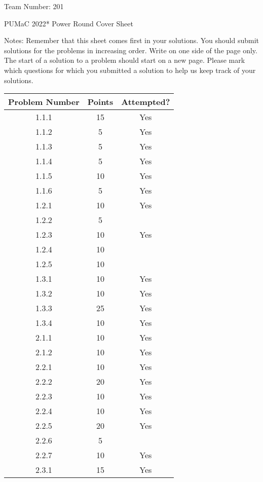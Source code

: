 \documentclass[12pt]{article}
\newcommand{\TeamNumber}{201}
\begin{document}
\thispagestyle{empty}
\noindent \huge{Team Number:} \TeamNumber
\vspace{.5cm}

\noindent \huge{PUMaC 2022* Power Round Cover Sheet}

\vspace{.5cm}
\normalsize
\begin{paragraph}{Notes:}
Remember that this sheet comes first in your solutions. You should submit solutions for the problems in increasing order. Write on one side of the page only. The start of a solution to a problem should start on a new page. Please mark which questions for which you submitted a solution to help us keep track of your solutions.
\end{paragraph}
\begin{center}
\begin{tabular}{|c|c|c|}\hline
Problem Number & Points & Attempted?\\\hline
1.1.1 & 15 & Yes \\\hline
1.1.2 & 5 & Yes \\\hline
1.1.3 & 5 & Yes \\\hline
1.1.4 & 5 & Yes \\\hline
1.1.5 & 10 & Yes \\\hline
1.1.6 & 5 & Yes \\\hline
1.2.1 & 10 & Yes \\\hline
1.2.2 & 5 &  \\\hline
1.2.3 & 10 & Yes \\\hline
1.2.4 & 10 & \\\hline
1.2.5 & 10 & \\\hline
1.3.1 & 10 & Yes \\\hline
1.3.2 & 10 & Yes \\\hline
1.3.3 & 25 & Yes \\\hline
1.3.4 & 10 & Yes \\\hline
2.1.1 & 10 & Yes \\\hline
2.1.2 & 10 & Yes \\\hline
2.2.1 & 10 & Yes \\\hline
2.2.2 & 20 & Yes \\\hline
2.2.3 & 10 & Yes \\\hline
2.2.4 & 10 & Yes\\\hline
2.2.5 & 20 & Yes\\\hline
2.2.6 & 5 & \\\hline
2.2.7 & 10 & Yes\\\hline
2.3.1 & 15 & Yes\\\hline

\end{tabular}
\end{center}
\end{document}
